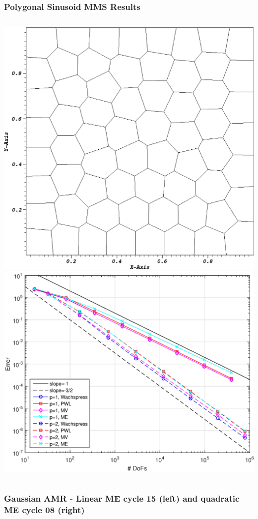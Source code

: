 \documentclass[compress,10pt]{beamer}
\begin{document}
\begin{frame}[t]
{\begin{columns}
\end{columns}
}
{
\frametitle{Polygonal Sinusoid MMS Results}
\vspace{1.5cm}
\begin{columns}
{}\includegraphics[width=0.8\columnwidth]{images/PolyMesh_mesh.eps}
{}\includegraphics[width=0.9\columnwidth]{images/TransMMS_Sine_poly_err.eps}
\end{columns}
}
{
\frametitle{\footnotesize Gaussian AMR - Linear ME cycle 15 (left) and quadratic ME cycle 08 (right)}
\begin{columns}
\centering

\end{columns}}
\end{frame}
\end{document}
